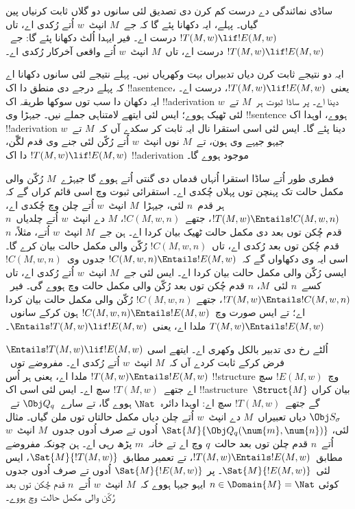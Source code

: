 \documentclass[../../../include/open-logic-section]{subfiles}
\begin{document}

\begin{explain}
ساڈی نمائندگی دے درست کم کرن دی تصدیق لئی سانوں دو
گلاں ثابت کرنیاں پین گیاں۔ پہلے، ایہ دکھانا پئے گا
کہ جے~$M$ انپٹ~$w$ اُتے رُکدی اے، تاں
$!T(M, w) \lif !E(M, w)$ درست اے۔ فیر ایہدا اُلٹ
دکھانا پئے گا: جے~$!T(M, w) \lif !E(M, w)$ درست
اے، تاں~$M$ انپٹ~$w$ اُتے واقعی آخرکار
رُکدی اے۔

ایہ دو نتیجے ثابت کرن دیاں تدبیراں بہت وکھریاں نیں۔
پہلے نتیجے لئی سانوں دکھانا اے کہ پہلے درجے دی منطق
دا اک !!a{sentence}، یعنی~$!T(M, w) \lif !E(M, w)$،
درست اے۔ ایہ دکھان دا سب توں سوکھا طریقہ اک
!!a{derivation} دینا اے۔ پر ساڈا ثبوت ہر~$M$ تے~$w$
لئی ٹھیک ہووے؛ ایس لئی ایتھے لامتناہی جملے نیں۔ جیہڑا وی
!!{sentence} ہووے، اوہدا اک !!a{derivation} دینا پئے گا۔
ایس لئی اسی استقرا نال ایہ
ثابت کر سکدے آں کہ~$M$ تے~$w$ جیہو جیہے وی ہون،
تے~$M$ نوں انپٹ~$w$ اُتے رُکّن لئی جنے وی قدم
لگّن، $!T(M, w) \lif !E(M, w)$ دا اک
!!a{derivation} موجود ہووے گا۔

فطری طور اُتے ساڈا استقرا اُنہاں قدماں دی گنتی اُتے
ہووے گا جیہڑے~$M$ رُکّن والی مکمل حالت تک پہنچن
توں پہلاں چُکدی اے۔ استقرائی ثبوت وچ اسی قائم
کراں گے کہ ہر قدم~$n$ لئی، جیہڑا~$M$ انپٹ~$w$
اُتے چلن وچ چُکدی اے، $!T(M, w) \Entails !C(M, w, n)$،
جتھے~$!C(M, w, n)$، $M$ دے انپٹ~$w$ اُتے
چلدیاں~$n$ قدم چُکن توں بعد دی مکمل حالت ٹھیک
بیان کردا اے۔ ہن جے~$M$ انپٹ~$w$ اُتے، مثلاً،
$n$ قدم چُکن توں بعد رُکدی اے، تاں~$!C(M, w, n)$
رُکّن والی مکمل حالت بیان کرے گا۔ اسی ایہ وی
دکھاواں گے کہ~$!C(M, w, n)
\Entails !E(M, w)$ جدوں وی~$!C(M, w, n)$ ایسی رُکّن
والی مکمل حالت بیان کردا اے۔ ایس لئی جے~$M$ انپٹ~$w$
اُتے رُکدی اے، تاں کسے~$n$ لئی~$M$، $n$ قدم
چُکن توں بعد رُکّن والی مکمل حالت وچ ہووے گی۔
فیر~$!T(M, w) \Entails !C(M, w, n)$، جتھے
$!C(M, w, n)$ رُکّن والی مکمل حالت بیان کردا اے؛
تے ایس صورت وچ~$!C(M, w, n) \Entails !E(M, w)$
ہون کرکے سانوں~$T(M, w) \Entails !E(M, w)$ ملدا
اے، یعنی~$\Entails !T(M, w) \lif !E(M, w)$۔

اُلٹے رخ دی تدبیر بالکل وکھری اے۔ ایتھے اسی
$\Entails !T(M, w) \lif !E(M, w)$ فرض کرکے
ثابت کردے آں کہ~$M$ انپٹ~$w$ اُتے رُکدی اے۔
مفروضے توں~$!T(M, w) \Entails !E(M,
w)$ ملدا اے، یعنی ہر اُس !!{structure} وچ~$!E(M,
w)$ سچ اے جتھے~$!T(M, w)$ سچ اے۔ ایس
لئی اسی اک !!a{structure}~$\Struct{M}$ بیان کراں
گے جتھے~$!T(M, w)$ سچ اے: اوہدا دائرہ~$\Nat$
ہووے گا، تے سارے~$\Obj Q_q$ تے~$\Obj S_\sigma$
دیاں تعبیراں~$M$ دے انپٹ~$w$ اُتے چلن دیاں
مکمل حالتاں توں ملن گیاں۔ مثال لئی،
$\Sat{M}{\Obj Q_q(\num{m}, \num{n})}$ اُدوں تے صرف اُدوں
جدوں~$M$ انپٹ~$w$ اُتے~$n$ قدم چلن توں بعد
حالت~$q$ وچ اے تے خانہ~$m$ پڑھ رہی اے۔
ہن چونکہ مفروضے مطابق~$!T(M, w) \Entails !E(M, w)$،
تے تعمیر مطابق~$\Sat{M}{!T(M,
  w)}$، ایس لئی~$\Sat{M}{!E(M, w)}$۔ پر
$\Sat{M}{!E(M, w)}$ اُدوں تے صرف اُدوں جدوں کوئی
$n \in \Domain{M} = \Nat$ ایہو جیہا ہووے کہ~$M$
انپٹ~$w$ اُتے~$n$ قدم چُکن توں بعد رُکّن
والی مکمل حالت وچ ہووے۔
\end{explain}
\end{document}
